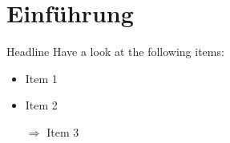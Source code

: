 
\section{Einführung}

\begin{frame}{Headline}
    Have a look at the following items:

    \begin{itemize}
        \item Item 1
        \item Item 2
        \pause
        \item[$\Rightarrow$] Item 3~\cite{template}
    \end{itemize}
\end{frame}
